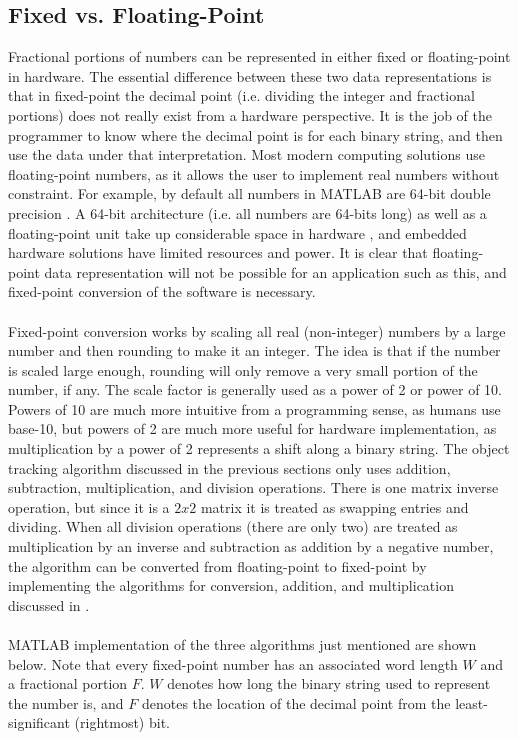 \documentclass[12pt]{article} %
\begin{document}
\subsection{Fixed vs. Floating-Point}
\label{sec:fp}
Fractional portions of numbers can be represented in either fixed or floating-point in hardware. The essential difference between these two data representations is that in fixed-point the decimal point (i.e. dividing the integer and fractional portions) does not really exist from a hardware perspective. It is the job of the programmer to know where the decimal point is for each binary string, and then use the data under that interpretation. Most modern computing solutions use floating-point numbers, as it allows the user to implement real numbers without constraint. For example, by default all numbers in MATLAB are 64-bit double precision \cite{10}. A 64-bit architecture (i.e. all numbers are 64-bits long) as well as a floating-point unit take up considerable space in hardware \cite{10}, and embedded hardware solutions have limited resources and power. It is clear that floating-point data representation will not be possible for an application such as this, and fixed-point conversion of the software is necessary. \\\\
Fixed-point conversion works by scaling all real (non-integer) numbers by a large number and then rounding to make it an integer. The idea is that if the number is scaled large enough, rounding will only remove a very small portion of the number, if any. The scale factor is generally used as a power of 2 or power of 10. Powers of 10 are much more intuitive from a programming sense, as humans use base-10, but powers of 2 are much more useful for hardware implementation, as multiplication by a power of 2 represents a shift along a binary string. The object tracking algorithm discussed in the previous sections only uses addition, subtraction, multiplication, and division operations. There is one matrix inverse operation, but since it is a $2x2$ matrix it is treated as swapping entries and dividing. When all division operations (there are only two) are treated as multiplication by an inverse and subtraction as addition by a negative number, the algorithm can be converted from floating-point to fixed-point by implementing the algorithms for conversion, addition, and multiplication discussed in \cite{10}. \\\\
MATLAB implementation of the three algorithms just mentioned are shown below. Note that every fixed-point number has an associated word length $W$ and a fractional portion $F$. $W$ denotes how long the binary string used to represent the number is, and $F$ denotes the location of the decimal point from the least-significant (rightmost) bit. \\\\
\end{document}
